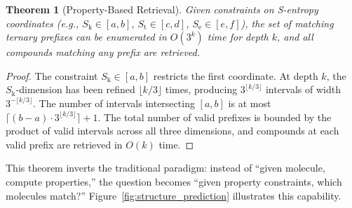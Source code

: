 \documentclass[11pt,twocolumn,a4paper]{article}
\newtheorem{theorem}{Theorem}[section]
\theoremstyle{definition}
\theoremstyle{remark}
\newcommand{\Sk}{S_{\mathrm{k}}}
\newcommand{\St}{S_{\mathrm{t}}}
\newcommand{\Se}{S_{\mathrm{e}}}
\begin{document}
\begin{theorem}[Property-Based Retrieval]
\label{thm:property_retrieval}
Given constraints on S-entropy coordinates (e.g., $\Sk \in [a,b]$, $\St \in [c,d]$, $\Se \in [e,f]$), the set of matching ternary prefixes can be enumerated in $O(3^k)$ time for depth $k$, and all compounds matching any prefix are retrieved.
\end{theorem}

\begin{proof}
The constraint $\Sk \in [a,b]$ restricts the first coordinate. At depth $k$, the $\Sk$-dimension has been refined $\lfloor k/3 \rfloor$ times, producing $3^{\lfloor k/3 \rfloor}$ intervals of width $3^{-\lfloor k/3 \rfloor}$. The number of intervals intersecting $[a,b]$ is at most $\lceil (b-a) \cdot 3^{\lfloor k/3 \rfloor} \rceil + 1$. The total number of valid prefixes is bounded by the product of valid intervals across all three dimensions, and compounds at each valid prefix are retrieved in $O(k)$ time.
\end{proof}

This theorem inverts the traditional paradigm: instead of ``given molecule, compute properties,'' the question becomes ``given property constraints, which molecules match?'' Figure~\ref{fig:structure_prediction} illustrates this capability.
\end{document}
